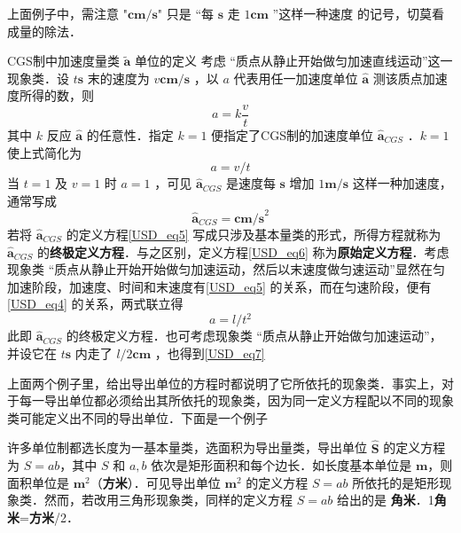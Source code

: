 上面例子中，需注意 "$\boldsymbol{cm/s}$" 只是 “每 $\boldsymbol{s}$ 走 $1\boldsymbol{cm}$ ”这样一种速度 的记号，切莫看成量的除法．
\begin{example}{CGS制中加速度量类 $\tilde{\boldsymbol{a}}$ 单位的定义}\label{USD_ex2}
考虑 “质点从静止开始做匀加速直线运动”这一现象类．设 $t\boldsymbol{s}$ 末的速度为 $v\boldsymbol{cm/s}$ ，以 $a$ 代表用任一加速度单位 $\hat{\boldsymbol{a}}$ 测该质点加速度所得的数，则
\begin{equation}\label{USD_eq6}
a=k\frac{v}{t}
\end{equation}
其中 $k$ 反应 $\hat{\boldsymbol{a}}$ 的任意性．指定 $k=1$ 便指定了CGS制的加速度单位 $\hat{\boldsymbol{a}}_{CGS}$ ．$k=1$ 使上式简化为
\begin{equation}\label{USD_eq5}
a=v/t
\end{equation}
当 $t=1$ 及 $v=1$ 时 $a=1$ ，可见 $\hat{\boldsymbol{a}}_{CGS}$ 是速度每 $\boldsymbol{s}$ 增加 $1\boldsymbol{m/s}$ 这样一种加速度，通常写成
\begin{equation}
\hat{\boldsymbol{a}}_{CGS}=\boldsymbol{cm/s}^2
\end{equation}
若将 $\hat{\boldsymbol{a}}_{CGS}$ 的定义方程\autoref{USD_eq5} 写成只涉及基本量类的形式，所得方程就称为  $\hat{\boldsymbol{a}}_{CGS}$ 的\textbf{终极定义方程}．与之区别，定义方程\autoref{USD_eq6} 称为\textbf{原始定义方程}．考虑现象类 “质点从静止开始开始做匀加速运动，然后以末速度做匀速运动”显然在匀加速阶段，加速度、时间和末速度有\autoref{USD_eq5} 的关系，而在匀速阶段，便有\autoref{USD_eq4} 的关系，两式联立得
\begin{equation}\label{USD_eq7}
a=l/t^2
\end{equation}
此即 $\hat{\boldsymbol{a}}_{CGS}$ 的终极定义方程．也可考虑现象类 “质点从静止开始做匀加速运动”，并设它在 $t\boldsymbol{s}$ 内走了 $l/2\boldsymbol{cm}$ ，也得到\autoref{USD_eq7} 
\end{example}
上面两个例子里，给出导出单位的方程时都说明了它所依托的现象类．事实上，对于每一导出单位都必须给出其所依托的现象类，因为同一定义方程配以不同的现象类可能定义出不同的导出单位．下面是一个例子
\begin{example}{}
许多单位制都选长度为一基本量类，选面积为导出量类，导出单位 $\hat{\boldsymbol{S}}$ 的定义方程为 $S=ab$，其中 $S$ 和 $a,b$ 依次是矩形面积和每个边长．如长度基本单位是 $\boldsymbol{m}$，则面积单位是 $\boldsymbol{m}^2$（\textbf{方米}）．可见导出单位 $\boldsymbol{m}^2$ 的定义方程 $S=ab$ 所依托的是矩形现象类．然而，若改用三角形现象类，同样的定义方程 $S=ab$ 给出的是 \textbf{角米}．1\textbf{角米}=\textbf{方米}/2．
\end{example}
